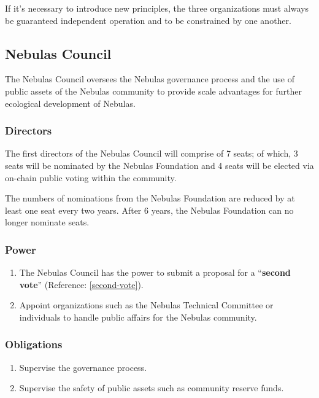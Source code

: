 If it's necessary to introduce new principles, the three organizations must always be guaranteed independent operation and to be constrained by one another.

\subsection{Nebulas Council}

The Nebulas Council oversees the Nebulas governance process and the use of public assets of the Nebulas community to provide scale advantages for further ecological development of Nebulas.

\subsubsection{Directors}

The first directors of the Nebulas Council will comprise of 7 seats; of which, 3 seats will be nominated by the Nebulas Foundation and 4 seats will be elected via on-chain public voting within the community.

The numbers of nominations from the Nebulas Foundation are reduced by at least one seat every two years. After 6 years, the Nebulas Foundation can no longer nominate seats.

\subsubsection{Power}

\begin{enumerate}
	\item The Nebulas Council has the power to submit a proposal for a “\textbf{second vote}” (Reference: \ref{second-vote}).
	\item Appoint organizations such as the Nebulas Technical Committee or individuals to handle public affairs for the Nebulas community.
\end{enumerate}

\subsubsection{Obligations}

\begin{enumerate}
	\item Supervise the governance process.
	\item Supervise the safety of public assets such as community reserve funds.
\end{enumerate}

